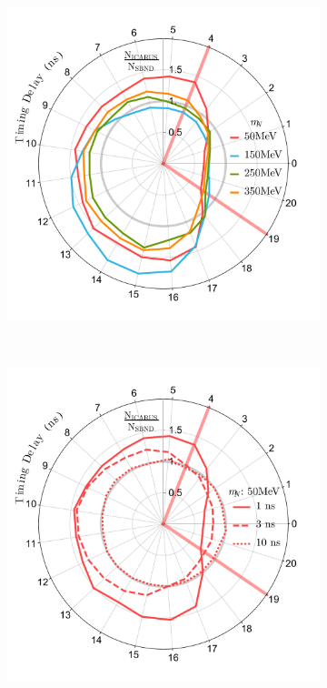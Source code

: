 \documentclass[11pt, a4paper]{article}
\begin{document}
\begin{figure}[t]
\center
\begin{subfigure}[t]{0.5\textwidth}
\includegraphics[width=\textwidth]{figures/ICARUS_the_great.pdf}
\end{subfigure}%
~
\begin{subfigure}[t]{0.5\textwidth}
\includegraphics[width=\textwidth]{figures/ICARUS_the_great2.pdf}

\end{subfigure}
\end{figure}
\end{document}
